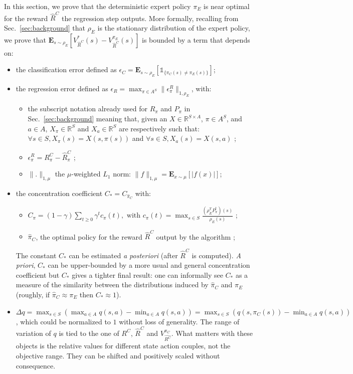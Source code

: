 \documentclass{llncs}
\newcommand{\E}{\mathbf{E}}
\begin{document}
In this section, we prove that the deterministic expert policy $\pi_E$ is near optimal for the reward $\hat{R}^C$ the regression step outputs.
More formally, recalling from Sec.~\ref{sec:background} that $\rho_E$ is the stationary distribution of the expert policy, we prove that $\E_{s\sim\rho_E}[V^*_{\hat{R}^C}(s)-V^{\pi_E}_{\hat{R}^C}(s)]$ is bounded by a term that depends on:
\begin{itemize}
  \item the classification error defined as
$\epsilon_C=\E_{s\sim\rho_E}[\mathds{1}_{\{\pi_C(s)\neq\pi_E(s)\}}]$;
\item the regression error defined as 
 $   \epsilon_R=\max_{\pi\in A^S}\|\epsilon_\pi^R\|_{1,\rho_E}$,
  with:
  \begin{itemize}
  \item the subscript notation already used for $R_\pi$ and $P_\pi$ in Sec.~\ref{sec:background} meaning that, given an $X\in\mathbb{R}^{S\times A}$, $\pi\in A^S$, and $a\in A$,  $X_\pi\in\mathbb{R}^S$ and $X_a\in\mathbb{R}^S$ are respectively such that: $\forall s\in S, X_\pi(s)=X(s,\pi(s))$ and $\forall s\in S, X_a(s)=X(s,a)$ ;
  \item $\epsilon^R_\pi=R^C_\pi-\hat{R}^C_\pi$ ;
  \item $\|.\|_{1,\mu}$ the $\mu$-weighted $L_1$ norm: $\|f\|_{1,\mu} = \E_{x\sim \mu}[|f(x)|]$;
  \end{itemize}
\item the concentration coefficient $C_* = C_{\hat \pi_C}$ with:
  \begin{itemize}
  \item $C_{\pi}=(1-\gamma)\sum_{t\geq0}\gamma^tc_{\pi}(t), \text{ with } c_{\pi}(t)=\max_{s\in S}\frac{(\rho_E^TP^t_\pi)(s)}{\rho_E(s)}$ ;
  \item $\hat \pi_C$, the optimal policy for the reward $\hat R^C$ output by the algorithm ;
  \end{itemize}
  The constant $C_*$ can be estimated \emph{a posteriori} (after $\hat{R}^C$ is computed). {\it A priori}, $C_*$ can be upper-bounded by a more usual and general concentration coefficient but $C_*$ gives a tighter final result: one can informally see $C_*$ as a measure of the similarity between the distributions induced by $\hat\pi_C$ and $\pi_E$ (roughly, if $\hat{\pi}_C\approx\pi_E$ then $C_* \approx 1$).
\item $\Delta q = \max_{s\in S}(\max_{a\in A}q(s,a)-\min_{a\in A}q(s,a))=\max_{s\in S}(q(s,\pi_C(s))-\min_{a\in A}q(s,a))$,
    which could be normalized to $1$ without loss of generality. The range of variation of $q$ is tied to the one of $R^C$, $\hat{R}^C$ and $V^{\pi_C}_{\hat{R^C}}$. What matters with these objects is the relative values for different state action couples, not the objective range. They can be shifted and positively scaled without consequence.
  \end{itemize}
\end{document}

